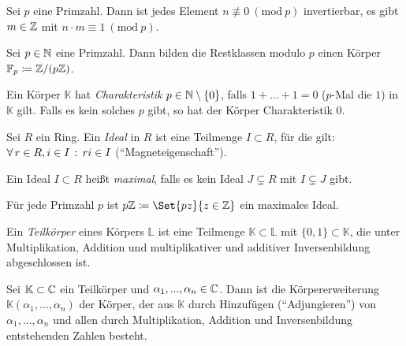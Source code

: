 \documentclass{cheat-sheet}
\newcommand{\K}{\mathbb{K}} %
\newcommand{\Mod}[1]{\ (\text{mod}\ #1)} %
\newcommand{\F}{\mathbb{F}} %
\renewcommand{\L}{\mathbb{L}} %
\begin{document}

\begin{lem}
  Sei $p$ eine Primzahl. Dann ist jedes Element $n \not\equiv 0 \Mod{p}$ invertierbar, \dh{} es gibt $m \in \mathbb{Z}$ mit $n \cdot m \equiv 1 \Mod{p}$.
\end{lem}

\begin{defn}
  Sei $p \in \mathbb{N}$ eine Primzahl. Dann bilden die Restklassen modulo $p$ einen Körper $\F_p \coloneqq \Z / (p \Z)$.
\end{defn}

\begin{defn}
  Ein Körper $\K$ hat \emph{Charakteristik} $p \in \mathbb{N} \setminus \{ 0 \}$, falls $1 + ... + 1 = 0$ ($p$-Mal die $1$) in $\K$ gilt. Falls es kein solches $p$ gibt, so hat der Körper Charakteristik $0$.
\end{defn}

\begin{defn}
  Sei $R$ ein Ring. Ein \emph{Ideal} in $R$ ist eine Teilmenge $I \subset R$, für die gilt: $\forall \, {r \in R, i \in I} \,:\, ri \in I$ ("`Magneteigenschaft"').
\end{defn}

\begin{defn}
  Ein Ideal $I \subset R$ heißt \emph{maximal}, falls es kein Ideal $J \subsetneq R$ mit $I \subsetneq J$ gibt.
\end{defn}

\begin{bem}
  Für jede Primzahl $p$ ist $p \Z \coloneqq \Set{ pz }{ z \in \Z }$ ein maximales Ideal.
\end{bem}


\begin{defn}
  Ein \emph{Teilkörper} eines Körpers $\L$ ist eine Teilmenge $\K \subset \L$ mit $\{ 0, 1 \} \subset \K$, die unter Multiplikation, Addition und multiplikativer und additiver Inversenbildung abgeschlossen ist.
\end{defn}

\begin{defn}
  Sei $\K \subset \C$ ein Teilkörper und $\alpha_1, ..., \alpha_n \in \mathbb{C}$. Dann ist die Körpererweiterung $\K(\alpha_1, ..., \alpha_n)$ der Körper, der aus $\K$ durch Hinzufügen ("`Adjungieren"') von $\alpha_1, ..., \alpha_n$ und allen durch Multiplikation, Addition und Inversenbildung entstehenden Zahlen besteht.
\end{defn}
\end{document}
